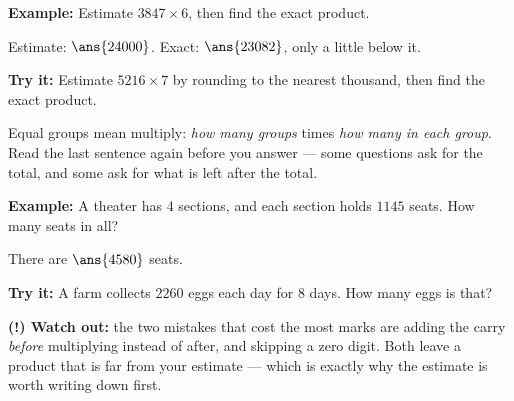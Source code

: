 \documentclass[12pt]{article}
\begin{document}
\begin{examplebox}
\textbf{Example:} Estimate $3847 \times 6$, then find the exact product.

Estimate: $\ans{24000}$. \quad Exact: $\ans{23082}$, only a little below it.
\end{examplebox}

\begin{tryitbox}
\textbf{Try it:} Estimate $5216 \times 7$ by rounding to the nearest thousand,
then find the exact product.\\[2pt]
\end{tryitbox}


\begin{formulabox}
Equal groups mean multiply: \emph{how many groups} times \emph{how many in
each group}. Read the last sentence again before you answer --- some questions
ask for the total, and some ask for what is left after the total.
\end{formulabox}

\begin{examplebox}
\textbf{Example:} A theater has $4$ sections, and each section holds $1145$
seats. How many seats in all?

There are $\ans{4580}$ seats.
\end{examplebox}

\begin{tryitbox}
\textbf{Try it:} A farm collects $2260$ eggs each day for $8$ days. How many
eggs is that?\\[2pt]
\end{tryitbox}

\begin{watchoutbox}
\textbf{(!) Watch out:} the two mistakes that cost the most marks are adding
the carry \emph{before} multiplying instead of after, and skipping a zero
digit. Both leave a product that is far from your estimate --- which is
exactly why the estimate is worth writing down first.
\end{watchoutbox}
\end{document}

